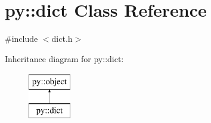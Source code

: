 \hypertarget{classpy_1_1dict}{}\section{py\+:\+:dict Class Reference}
\label{classpy_1_1dict}


{\ttfamily \#include $<$dict.\+h$>$}

Inheritance diagram for py\+:\+:dict\+:\begin{figure}[H]
\begin{center}
\leavevmode
\includegraphics[height=2.000000cm]{classpy_1_1dict}
\end{center}
\end{figure}

